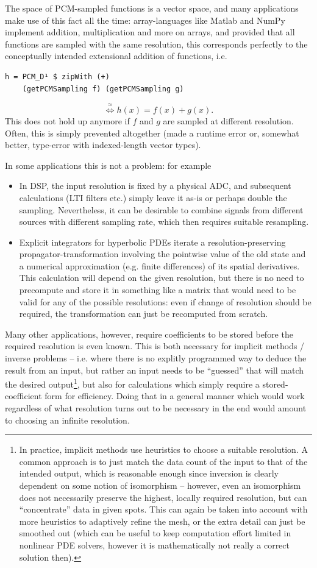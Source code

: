 \documentclass[sigplan,screen]{acmart}
\theoremstyle{acmplain}
\theoremstyle{acmdefinition}
\begin{document}
The space of PCM-sampled functions is a vector space, and many applications make use of this fact all the time: array-languages like Matlab and NumPy implement addition, multiplication and more on arrays, and provided that all functions are sampled with the same resolution, this corresponds perfectly to the conceptually intended extensional addition of functions, i.e.
\begin{lstlisting}
h = PCM_D¹ $ zipWith (+)
    (getPCMSampling f) (getPCMSampling g)
\end{lstlisting}
\[
  \stackrel{\approx}{\Leftrightarrow} h(x) = f(x) + g(x).
\]
This does not hold up anymore if $f$ and $g$ are sampled at different resolution. Often, this is simply prevented altogether (made a runtime error or, somewhat better, type-error with indexed-length vector types).

In some applications this is not a problem: for example
\begin{itemize}
 \item In DSP, the input resolution is fixed by a physical ADC, and subsequent calculations (LTI filters etc.) simply leave it as-is or perhaps double the sampling. Nevertheless, it can be desirable to combine signals from different sources with different sampling rate, which then requires suitable resampling.
 \item Explicit integrators for hyperbolic PDEs iterate a re\-so\-lu\-tion-pre\-ser\-ving pro\-pa\-ga\-tor-trans\-for\-ma\-tion in\-vol\-ving the pointwise value of the old state and a numerical approximation (e.g. finite differences) of its spatial derivatives. This calculation will depend on the given resolution, but there is no need to precompute and store it in something like a matrix that would need to be valid for any of the possible resolutions: even if change of resolution should be required, the transformation can just be recomputed from scratch.
\end{itemize}
Many other applications, however, require coefficients to be stored before the required resolution is even known.
This is both necessary for implicit methods / inverse problems -- i.e. where there is no explitly programmed way to deduce the result from an input, but rather an input needs to be “guessed” that will match the desired output\footnote{
In practice, implicit methods use heuristics to choose a suitable resolution. A common approach is to just match the data count of the input to that of the intended output, which is reasonable enough since inversion is clearly dependent on some notion of isomorphism -- however, even an isomorphism does not necessarily preserve the highest, locally required resolution, but can “concentrate” data in given spots. This can again be taken into account with more heuristics to adaptively refine the mesh, or the extra detail can just be smoothed out (which can be useful to keep computation effort limited in nonlinear PDE solvers, however it is mathematically not really a correct solution then).
}, but also for calculations which simply require a stored-coefficient form for efficiency. Doing that in a general manner which would work regardless of what resolution turns out to be necessary in the end would amount to choosing an infinite resolution.
\end{document}
